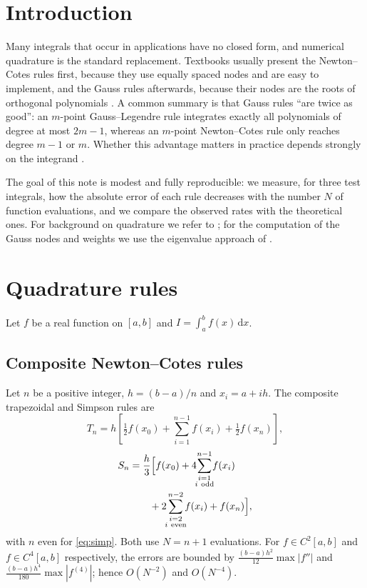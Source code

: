 \documentclass[10pt,twocolumn,a4paper]{article}
\theoremstyle{plain}
\theoremstyle{remark}
\begin{document}
\section{Introduction}
Many integrals that occur in applications have no closed form, and numerical quadrature is the standard replacement.
Textbooks usually present the Newton--Cotes rules first, because they use equally spaced nodes and are easy to implement, and the Gauss rules afterwards, because their nodes are the roots of orthogonal polynomials \citep{burden2016,press2007}.
A common summary is that Gauss rules ``are twice as good'': an $m$-point Gauss--Legendre rule integrates exactly all polynomials of degree at most $2m-1$, whereas an $m$-point Newton--Cotes rule only reaches degree $m-1$ or $m$.
Whether this advantage matters in practice depends strongly on the integrand \citep{trefethen2008}.

The goal of this note is modest and fully reproducible: we measure, for three test integrals, how the absolute error of each rule decreases with the number $N$ of function evaluations, and we compare the observed rates with the theoretical ones.
For background on quadrature we refer to \citet{davis1984}; for the computation of the Gauss nodes and weights we use the eigenvalue approach of \citet{golub1969}.

\section{Quadrature rules}
Let $f$ be a real function on $[a,b]$ and $I=\int_a^b f(x)\,\mathrm{d}x$.

\subsection{Composite Newton--Cotes rules}
Let $n$ be a positive integer, $h=(b-a)/n$ and $x_i=a+ih$. The composite trapezoidal and Simpson rules are
\begin{equation}
  T_n = h\left[\tfrac12 f(x_0)+\sum_{i=1}^{n-1}f(x_i)+\tfrac12 f(x_n)\right],
  \label{eq:trap}
\end{equation}
\begin{equation}
  \begin{split}
    S_n &= \frac h3\Bigl[f(x_0)+4\!\!\sum_{\substack{i=1\\ i\ \mathrm{odd}}}^{n-1}\!\!f(x_i)\\
        &\qquad{}+2\!\!\sum_{\substack{i=2\\ i\ \mathrm{even}}}^{n-2}\!\!f(x_i)+f(x_n)\Bigr],
  \end{split}
  \label{eq:simp}
\end{equation}
with $n$ even for \eqref{eq:simp}. Both use $N=n+1$ evaluations.
For $f\in C^2[a,b]$ and $f\in C^4[a,b]$ respectively, the errors are bounded by $\tfrac{(b-a)h^2}{12}\max|f''|$ and $\tfrac{(b-a)h^4}{180}\max|f^{(4)}|$; hence $O(N^{-2})$ and $O(N^{-4})$.
\end{document}
